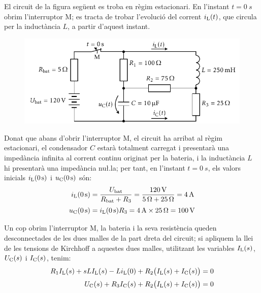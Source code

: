 \begin{exemple}

El circuit de la figura seg\"{u}ent es troba en r\`{e}gim estacionari. En
l'instant $t=\SI{0}{s}$ obrim l'interruptor M; es tracta de trobar
l'evoluci\'{o} del corrent $i_\mathrm{L}(t)$, que circula per la induct\`{a}ncia
$L$, a partir d'aquest instant.

\begin{figure}[h]
    \centering
    \includegraphics{Imatges/Cap-Laplace-Exemple3-Circuit.pdf}
\end{figure}

 Donat que abans d'obrir l'interruptor M, el circuit ha arribat al
 r\`{e}gim estacionari, el condensador $C$ estar\`{a} totalment carregat  i
 presentar\`{a} una imped\`{a}ncia infinita al corrent continu originat per la
 bateria, i la induct\`{a}ncia $L$ hi presentar\`{a} una imped\`{a}ncia nu{\l.l}a;
 per tant, en l'instant $t=\SI{0}{s}$, els valors inicials $i_\mathrm{L}(\SI{0}{s})$ i
 $u_\mathrm{C}(\SI{0}{s})$ s\'{o}n:
 \begin{align*}
    i_\mathrm{L}(\SI{0}{s}) &= \frac{U_\mathrm{bat}}{R_\mathrm{bat} + R_3} = \frac{\SI{120}{V}}
    {\SI{5}{\ensuremath{\mathrm{\Omega}}} + \SI{25}{\ensuremath{\mathrm{\Omega}}}} = \SI{4}{A} \\[0.5ex]
    u_\mathrm{C}(\SI{0}{s}) &= i_\mathrm{L}(\SI{0}{s}) R_3 = \SI{4}{A}\times \SI{25}{\ensuremath{\mathrm{\Omega}}} = \SI{100}{V}
 \end{align*}

Un cop obrim l'interruptor M, la bateria i la seva resist\`{e}ncia
queden desconnectades de les dues malles de la part dreta del circuit; si apliquem la llei de les tensions de Kirchhoff  a aquestes
dues malles, utilitzant les variables $I_\mathrm{L}(s)$, $U_\mathrm{C}(s)$ i
$I_\mathrm{C}(s)$, tenim:
\begin{align*}
    R_1 I_\mathrm{L}(s) + s L I_\mathrm{L}(s) - L i_\mathrm{L}(0) + R_2
    \bigl(I_\mathrm{L}(s) + I_\mathrm{C}(s)\bigr) &=0 \\[0.5ex]
    U_\mathrm{C}(s) + R_3 I_\mathrm{C}(s) + R_2 \bigl(I_\mathrm{L}(s) + I_\mathrm{C}(s)\bigr) &=0
\end{align*}


\end{exemple}
